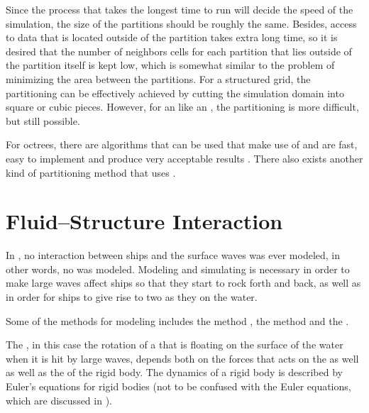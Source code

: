 Since the process that takes the longest time to run will decide the speed of the simulation, the size of the partitions should be roughly the same. Besides, access to data that is located outside of the partition takes extra long time, so it is desired that the number of neighbors cells for each partition that lies outside of the partition itself is kept low, which is somewhat similar to the problem of minimizing the area between the partitions. For a structured grid, the partitioning can be effectively achieved by cutting the simulation domain into square or cubic pieces. However, for an  like an \octree, the partitioning is more difficult, but still possible.

For octrees, there are algorithms that can be used that make use of  and are fast, easy to implement and produce very acceptable results \citep{Valgaerts,Ji2012}. There also exists another kind of partitioning method that uses  \citep{Fuster2011,Agbaglah2011}.

\section{Fluid--Structure Interaction}

In \thisprojectwork, no interaction between ships and the surface waves was ever modeled, in other words, no \FSI was modeled. Modeling and simulating \FSI is necessary in order to make large waves affect ships so that they start to rock forth and back, as well as in order for ships to give rise to two  as they \sail on the water.
    
Some of the methods for modeling \FSI includes the \IB method \citep{Peskin2002,Ghias2007}, the \VOS method and the  \citep{Carlson2004}.

The , in this case the rotation of a \ship that is floating on the surface of the water when it is hit by large waves, depends both on the forces that acts on the  as well as well as the   of the rigid body. The dynamics of a rigid body is described by Euler's equations for rigid bodies (not to be confused with the Euler equations, which are discussed in ).

